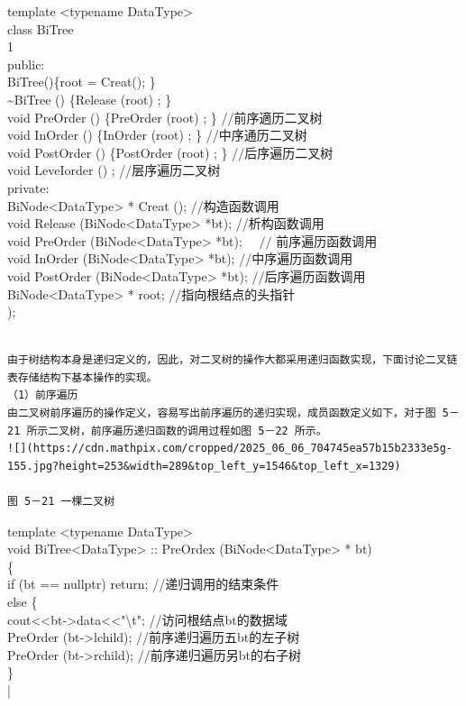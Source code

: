 \documentclass[10pt]{article}
\begin{document}
template <typename DataType>\\
class BiTree\\
1\\
public:\\
BiTree()\{root = Creat(); \}\\
\~{}BiTree () \{Release (root) ; \}\\
void PreOrder () \{PreOrder (root) ; \} //前序適历二叉树\\
void InOrder () \{InOrder (root) ; \} //中序通历二叉树\\
void PostOrder () \{PostOrder (root) ; \} //后序遍历二叉树\\
void LeveIorder () ; //层序遍历二叉树\\
private:\\
BiNode<DataType> * Creat (); //构造函数调用\\
void Release (BiNode<DataType> *bt); //析构函数调用\\
void PreOrder (BiNode<DataType> *bt); $\quad / /$ 前序遍历函数调用\\
void InOrder (BiNode<DataType> *bt); //中序遍历函数调用\\
void PostOrder (BiNode<DataType> *bt); //后序遍历函数调用\\
BiNode<DataType> * root; //指向根结点的头指针\\
);

\begin{verbatim}

由于树结构本身是递归定义的，因此，对二叉树的操作大都采用递归函数实现，下面讨论二叉链表存储结构下基本操作的实现。
（1）前序遍历
由二叉树前序遍历的操作定义，容易写出前序遍历的递归实现，成员函数定义如下，对于图 5－21 所示二叉树，前序遍历递归函数的调用过程如图 5－22 所示。
![](https://cdn.mathpix.com/cropped/2025_06_06_704745ea57b15b2333e5g-155.jpg?height=253&width=289&top_left_y=1546&top_left_x=1329)

图 5－21 一棵二叉树
\end{verbatim}

template <typename DataType>\\
void BiTree<DataType> :: PreOrdex (BiNode<DataType> * bt)\\
\{\\
if (bt == nullptr) return; //递归调用的结束条件\\
else \{\\
cout<<bt->data<<"\textbackslash t"; //访问根结点bt的数据域\\
PreOrder (bt->lchild); //前序递归遍历五bt的左子树\\
PreOrder (bt->rchild); //前序递归遍历另bt的右子树\\
\}\\
|
\end{document}
